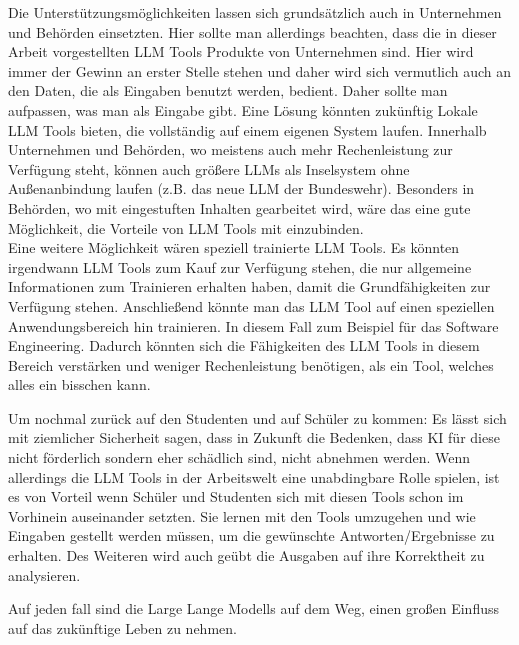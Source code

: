 Die Unterstützungsmöglichkeiten lassen sich grundsätzlich auch in Unternehmen und Behörden einsetzten. Hier sollte man 
allerdings beachten, dass die in dieser Arbeit vorgestellten LLM Tools Produkte von Unternehmen sind. Hier wird immer 
der Gewinn an erster Stelle stehen und daher wird sich vermutlich auch an den Daten, die als Eingaben benutzt werden, 
bedient. Daher sollte man aufpassen, was man als Eingabe gibt. Eine Lösung könnten zukünftig Lokale LLM Tools bieten,
die vollständig auf einem eigenen System laufen. Innerhalb Unternehmen und Behörden, wo meistens auch mehr Rechenleistung 
zur Verfügung steht, können auch größere LLMs als Inselsystem ohne Außenanbindung laufen (z.B. das neue LLM der Bundeswehr). 
Besonders in Behörden, wo mit eingestuften Inhalten gearbeitet wird, wäre das eine gute Möglichkeit, die Vorteile 
von LLM Tools mit einzubinden.\\
Eine weitere Möglichkeit wären speziell trainierte LLM Tools. Es könnten irgendwann LLM Tools zum Kauf zur 
Verfügung stehen, die nur allgemeine Informationen zum Trainieren erhalten haben, damit die Grundfähigkeiten zur 
Verfügung stehen. Anschließend könnte man das LLM Tool auf einen speziellen Anwendungsbereich hin trainieren. In diesem 
Fall zum Beispiel für das Software Engineering. Dadurch könnten sich die Fähigkeiten des LLM Tools in diesem Bereich 
verstärken und weniger Rechenleistung benötigen, als ein Tool, welches alles ein bisschen kann.

Um nochmal zurück auf den Studenten und auf Schüler zu kommen: Es lässt sich mit ziemlicher Sicherheit sagen, 
dass in Zukunft die Bedenken, dass KI für diese nicht förderlich sondern eher schädlich sind, nicht abnehmen 
werden. Wenn allerdings die LLM Tools in der Arbeitswelt eine unabdingbare Rolle spielen, ist es von Vorteil 
wenn Schüler und Studenten sich mit diesen Tools schon im Vorhinein auseinander setzten. Sie lernen mit den Tools 
umzugehen und wie Eingaben gestellt werden müssen, um die gewünschte Antworten/Ergebnisse zu erhalten. Des Weiteren 
wird auch geübt die Ausgaben auf ihre Korrektheit zu analysieren.

Auf jeden fall sind die Large Lange Modells auf dem Weg, einen großen Einfluss auf das zukünftige Leben zu nehmen.